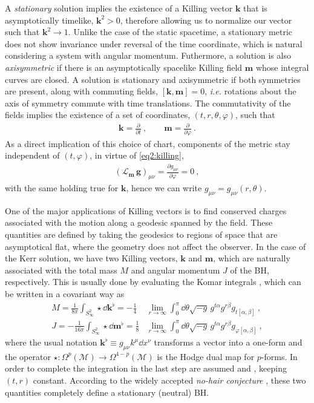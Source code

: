 A \emph{stationary} solution implies the existence of a Killing vector $\bm{k}$ that is asymptotically timelike, $\bm{k}^2>0$, therefore allowing us to normalize our vector such that $\bm{k}^2 \rightarrow 1$. 
Unlike the case of the static spacetime, a stationary metric does not show invariance under reversal of the time coordinate, which is natural considering a system with angular momentum. 
Futhermore, a solution is also \emph{axisymmetric} if there is an asymptotically spacelike Killing field $\bm{m}$ whose integral curves are closed.
A solution is stationary and axisymmetric if both symmetries are present, along with commuting fields, $[\bm{k} , \bm{m}] = 0$, \emph{i.e.} rotations about the axis of symmetry commute with time translations. The commutativity of the fields implies the existence of a set of coordinates, $(t,r,\theta,\varphi)$, such that
\begin{align}
    \bm{k} = \frac{\partial}{\partial t} ~, \qquad \bm{m} = \frac{\partial}{\partial \varphi} ~.
    \label{eq2:tPhiKilling}
\end{align}
As a direct implication of this choice of chart, components of the metric stay independent of $(t,\varphi)$, in virtue of \eqref{eq2:killing},
\begin{align}
    \left(\mathscr{L}_{\bm{m}} \,\bm{g} \right)_{\mu\nu} = \frac{\partial g_{\mu\nu}}{\partial \varphi} = 0 ~,
    \label{eq2:lieMetricTPhi}
\end{align}
with the same holding true for $\bm{k}$, hence we can write $g_{\mu\nu} = g_{\mu\nu}(r,\theta)$. 

One of the major applications of Killing vectors is to find conserved charges associated with the motion along a geodesic spanned by the field.
These quantities are defined by taking the geodesics to regions of space that are asymptotical flat, where the geometry does not affect the observer.
In the case of the Kerr solution, we have two Killing vectors, $\bm{k}$ and $\bm{m}$, which are naturally associated with the total mass $M$ and angular momentum $J$ of the BH, respectively.
This is usually done by evaluating the Komar integrals \cite{Heusler1996, Wald2010}, which can be written in a covariant way as
\begin{align}
    M = \frac{1}{8 \pi} \int_{S^2_\infty} \star \dd \bm{k}^\flat  =  -\frac{1}{4}& \lim_{r\to\infty}  \int_0^\pi \dd\theta \sqrt{-g} \, g^{t\alpha} g^{r\beta} g_{t[\alpha,\beta]} ~, \label{eq2:komarMass} \\
    J = -\frac{1}{16 \pi} \int_{S^2_\infty} \star \dd \bm{m}^\flat = \frac{1}{8}& \lim_{r\to\infty}  \int_0^\pi \dd\theta \sqrt{-g} \, g^{t\alpha} g^{r\beta} g_{\varphi[\alpha,\beta]} ~, \label{eq2:komarSpin}
\end{align}
where the usual notation $\bm{k}^\flat \equiv g_{\mu\nu} k^\mu \dd x^\nu$ transforms a vector into a one-form and the operator $\star : \Omega^{p}(\mathscr{M})\to\Omega^{4-p}(\mathscr{M})$ is the Hodge dual map for $p$-forms.
In order to complete the integration in the last step are assumed  and , keeping $(t,r)$ constant. 
According to the widely accepted \emph{no-hair conjecture} \cite{Carter1971}, these two quantities completely define a stationary (neutral) BH. 

